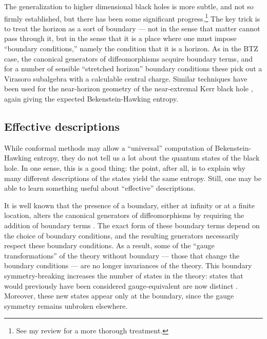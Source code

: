 \documentclass[12pt]{article}
\begin{document}
The generalization to higher dimensional black holes \cite{Carlipcfta,%
Carlipcftb,Carlipcftc} is more subtle, and not so firmly established, but there 
has been some significant progress.\footnote{See my review \cite{Carlipcftd}
for a more thorough treatment.}  The key trick is to treat the horizon as 
a sort of boundary --- not in the sense that matter cannot pass through
it, but in the sense that it is a place where one must impose ``boundary
conditions,'' namely the condition that it is a horizon.  As in the BTZ
case, the canonical generators of diffeomorphisms acquire boundary
terms, and for a number of sensible ``stretched horizon'' boundary
conditions these pick out a Virasoro subalgebra with a calculable central
charge.  Similar techniques have been used for the near-horizon geometry
of the near-extremal Kerr black hole \cite{GHSS}, again giving the expected
Bekenstein-Hawking entropy.

\subsection{Effective descriptions \label{effecta}}

While conformal methods may allow a ``universal'' computation of
Bekenstein-Hawking entropy, they do not tell us a lot about the quantum
states of the black hole.  In one sense, this is a good thing: the point,
after all, is to explain why many different descriptions of the states
yield the same entropy.  Still, one may be able to learn something
useful about ``effective'' descriptions.

It is well known that the presence of a boundary, either at infinity or 
at a finite location, alters the canonical generators of diffeomorphisms 
by requiring the addition of boundary terms \cite{Regge}.   The 
exact form of these boundary terms depend on the choice of boundary 
conditions, and the resulting generators necessarily respect these 
boundary conditions.  As a result, some of the ``gauge transformations''
of the theory without boundary --- those that change the boundary
conditions --- are no longer invariances of the theory.  This boundary
symmetry-breaking increases the number of states in the theory: 
states that would previously have been considered gauge-equivalent
are now distinct \cite{Carlip_wouldbe}.  Moreover, these new states 
appear only at the boundary, since the gauge symmetry remains
unbroken elsewhere.
\end{document}
